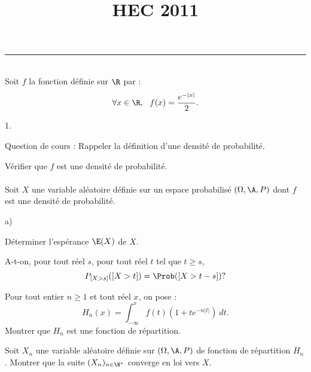 \documentclass[11pt]{article}%
\title{\bf \vspace{-1.6cm} HEC 2011} %
\author{} %
\date{} %
\begin{document}
\maketitle %
\vspace{-1.2cm}\hrule %
\thispagestyle{fancy}

\vspace*{.2cm}



\begin{exerciceAP}~\\
  Soit $f$ la fonction définie sur $\R$ par :
  \[
  \forall x \in \R,\ \ f(x) = \frac{e^{- \vert x \vert} }{2}.
  \]
  \begin{noliste}{1.}
    \setlength{\itemsep}{2mm}
  \item Question de cours : Rappeler la définition d'une densité de probabilité.
  \item Vérifier que $f$ est une densité de probabilité. \\ \\
    Soit $X$ une variable aléatoire définie sur un espace probabilisé
    $(\Omega , \A , P)$ dont $f$ est une densité de probabilité.
  \item 
    \begin{noliste}{a)}
    \setlength{\itemsep}{2mm} 
    \item Déterminer l'espérance $\E(X)$ de $X$.
    \item A-t-on, pour tout réel $s$, pour tout réel $t$ tel que $t \geq s$, 
      \[
      P_{[X > s]} ( [X > t]) = \Prob( [X > t - s])?
      \]
    \end{noliste}
  \item Pour tout entier $n \geq 1$ et tout réel $x$, on pose : 
    \[
    H_n(x) = \int_{-\infty}^x f(t) (1 + t e^{- n \vert t \vert} )\ dt.
    \]
    Montrer que $H_n$ est une fonction de répartition.
  \item Soit $X_n$ une variable aléatoire définie sur $(\Omega , \A ,
    P)$ de fonction de répartition $H_n$. Montrer que la suite
    $(X_n)_{n \in \N^*}$ converge en loi vers $X$.
  \end{noliste}
\end{exerciceAP}

\end{document}
